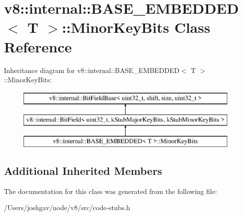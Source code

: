 \hypertarget{classv8_1_1internal_1_1_b_a_s_e___e_m_b_e_d_d_e_d_1_1_minor_key_bits}{}\section{v8\+:\+:internal\+:\+:B\+A\+S\+E\+\_\+\+E\+M\+B\+E\+D\+D\+ED$<$ T $>$\+:\+:Minor\+Key\+Bits Class Reference}
\label{classv8_1_1internal_1_1_b_a_s_e___e_m_b_e_d_d_e_d_1_1_minor_key_bits}
Inheritance diagram for v8\+:\+:internal\+:\+:B\+A\+S\+E\+\_\+\+E\+M\+B\+E\+D\+D\+ED$<$ T $>$\+:\+:Minor\+Key\+Bits\+:\begin{figure}[H]
\begin{center}
\leavevmode
\includegraphics[height=3.000000cm]{classv8_1_1internal_1_1_b_a_s_e___e_m_b_e_d_d_e_d_1_1_minor_key_bits}
\end{center}
\end{figure}
\subsection*{Additional Inherited Members}


The documentation for this class was generated from the following file\+:\begin{DoxyCompactItemize}
\item 
/\+Users/joshgav/node/v8/src/code-\/stubs.\+h\end{DoxyCompactItemize}
